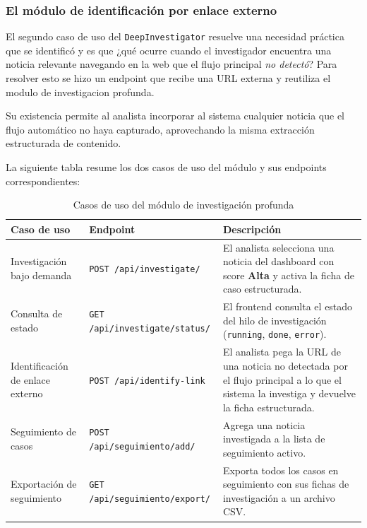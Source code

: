 \subsubsection*{El módulo de identificación por enlace externo}

El segundo caso de uso del \texttt{DeepInvestigator} resuelve una necesidad
práctica que se identificó y es que ¿qué ocurre cuando el
investigador encuentra una noticia relevante navegando en la web que el
flujo principal \textit{no detectó}? Para resolver esto se
hizo un endpoint que recibe una URL externa y reutiliza el modulo de
investigacion profunda.

Su existencia permite al analista incorporar al sistema cualquier noticia
que el flujo automático no haya capturado, aprovechando la misma
extracción estructurada de contenido.

La siguiente tabla resume los dos casos de uso del módulo y sus endpoints
correspondientes:

\vspace{0.5cm}
\begin{table}[H]
\centering
\begin{threeparttable}
\caption{Casos de uso del módulo de investigación profunda}
\label{tab:investigador_casos}
\begin{tabular}{|p{3.5cm}|p{4cm}|p{4.5cm}|}\hline
\textbf{Caso de uso} & \textbf{Endpoint} & \textbf{Descripción} \\\hline
Investigación bajo demanda &
\texttt{POST /api/investigate/} &
El analista selecciona una noticia del dashboard con score \textbf{Alta} y
activa la ficha de caso estructurada. \\
\hline
Consulta de estado &
\texttt{GET /api/investigate/status/} &
El frontend consulta el estado del hilo de investigación
(\texttt{running}, \texttt{done}, \texttt{error}). \\
\hline
Identificación de enlace externo &
\texttt{POST /api/identify-link} &
El analista pega la URL de una noticia no detectada por el
flujo principal a lo que el sistema la investiga y devuelve
la ficha estructurada.\\
\hline
Seguimiento de casos &
\texttt{POST /api/seguimiento/add/} &
Agrega una noticia investigada a la lista de seguimiento activo.\\
\hline
Exportación de seguimiento &
\texttt{GET /api/seguimiento/export/} &
Exporta todos los casos en seguimiento con sus fichas de investigación
a un archivo CSV.\\
\hline
\end{tabular}
\end{threeparttable}
\end{table}

